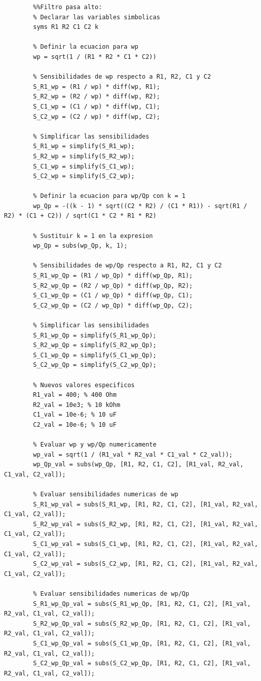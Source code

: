 \documentclass[12pt]{article}
\begin{document}
	\begin{lstlisting}
		%%Filtro pasa alto:
		% Declarar las variables simbolicas
		syms R1 R2 C1 C2 k
		
		% Definir la ecuacion para wp
		wp = sqrt(1 / (R1 * R2 * C1 * C2))
		
		% Sensibilidades de wp respecto a R1, R2, C1 y C2
		S_R1_wp = (R1 / wp) * diff(wp, R1);
		S_R2_wp = (R2 / wp) * diff(wp, R2);
		S_C1_wp = (C1 / wp) * diff(wp, C1);
		S_C2_wp = (C2 / wp) * diff(wp, C2);
		
		% Simplificar las sensibilidades
		S_R1_wp = simplify(S_R1_wp);
		S_R2_wp = simplify(S_R2_wp);
		S_C1_wp = simplify(S_C1_wp);
		S_C2_wp = simplify(S_C2_wp);
		
		% Definir la ecuacion para wp/Qp con k = 1
		wp_Qp = -((k - 1) * sqrt((C2 * R2) / (C1 * R1)) - sqrt(R1 / R2) * (C1 + C2)) / sqrt(C1 * C2 * R1 * R2)
		
		% Sustituir k = 1 en la expresion
		wp_Qp = subs(wp_Qp, k, 1);
		
		% Sensibilidades de wp/Qp respecto a R1, R2, C1 y C2
		S_R1_wp_Qp = (R1 / wp_Qp) * diff(wp_Qp, R1);
		S_R2_wp_Qp = (R2 / wp_Qp) * diff(wp_Qp, R2);
		S_C1_wp_Qp = (C1 / wp_Qp) * diff(wp_Qp, C1);
		S_C2_wp_Qp = (C2 / wp_Qp) * diff(wp_Qp, C2);
		
		% Simplificar las sensibilidades
		S_R1_wp_Qp = simplify(S_R1_wp_Qp);
		S_R2_wp_Qp = simplify(S_R2_wp_Qp);
		S_C1_wp_Qp = simplify(S_C1_wp_Qp);
		S_C2_wp_Qp = simplify(S_C2_wp_Qp);
		
		% Nuevos valores especificos
		R1_val = 400; % 400 Ohm
		R2_val = 10e3; % 10 kOhm
		C1_val = 10e-6; % 10 uF
		C2_val = 10e-6; % 10 uF
		
		% Evaluar wp y wp/Qp numericamente
		wp_val = sqrt(1 / (R1_val * R2_val * C1_val * C2_val));
		wp_Qp_val = subs(wp_Qp, [R1, R2, C1, C2], [R1_val, R2_val, C1_val, C2_val]);
		
		% Evaluar sensibilidades numericas de wp
		S_R1_wp_val = subs(S_R1_wp, [R1, R2, C1, C2], [R1_val, R2_val, C1_val, C2_val]);
		S_R2_wp_val = subs(S_R2_wp, [R1, R2, C1, C2], [R1_val, R2_val, C1_val, C2_val]);
		S_C1_wp_val = subs(S_C1_wp, [R1, R2, C1, C2], [R1_val, R2_val, C1_val, C2_val]);
		S_C2_wp_val = subs(S_C2_wp, [R1, R2, C1, C2], [R1_val, R2_val, C1_val, C2_val]);
		
		% Evaluar sensibilidades numericas de wp/Qp
		S_R1_wp_Qp_val = subs(S_R1_wp_Qp, [R1, R2, C1, C2], [R1_val, R2_val, C1_val, C2_val]);
		S_R2_wp_Qp_val = subs(S_R2_wp_Qp, [R1, R2, C1, C2], [R1_val, R2_val, C1_val, C2_val]);
		S_C1_wp_Qp_val = subs(S_C1_wp_Qp, [R1, R2, C1, C2], [R1_val, R2_val, C1_val, C2_val]);
		S_C2_wp_Qp_val = subs(S_C2_wp_Qp, [R1, R2, C1, C2], [R1_val, R2_val, C1_val, C2_val]);
		

\end{lstlisting}
\end{document}
